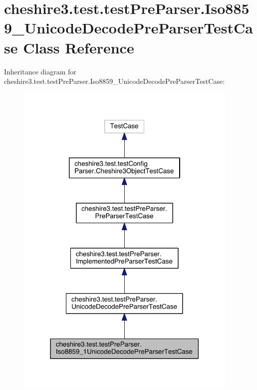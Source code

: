 \hypertarget{classcheshire3_1_1test_1_1test_pre_parser_1_1_iso8859__1_unicode_decode_pre_parser_test_case}{\section{cheshire3.\-test.\-test\-Pre\-Parser.\-Iso8859\-\_\-Unicode\-Decode\-Pre\-Parser\-Test\-Case Class Reference}
\label{classcheshire3_1_1test_1_1test_pre_parser_1_1_iso8859__1_unicode_decode_pre_parser_test_case}
}


Inheritance diagram for cheshire3.\-test.\-test\-Pre\-Parser.\-Iso8859\-\_\-Unicode\-Decode\-Pre\-Parser\-Test\-Case\-:
\nopagebreak
\begin{figure}[H]
\begin{center}
\leavevmode
\includegraphics[width=302pt]{classcheshire3_1_1test_1_1test_pre_parser_1_1_iso8859__1_unicode_decode_pre_parser_test_case__inherit__graph}
\end{center}
\end{figure}


